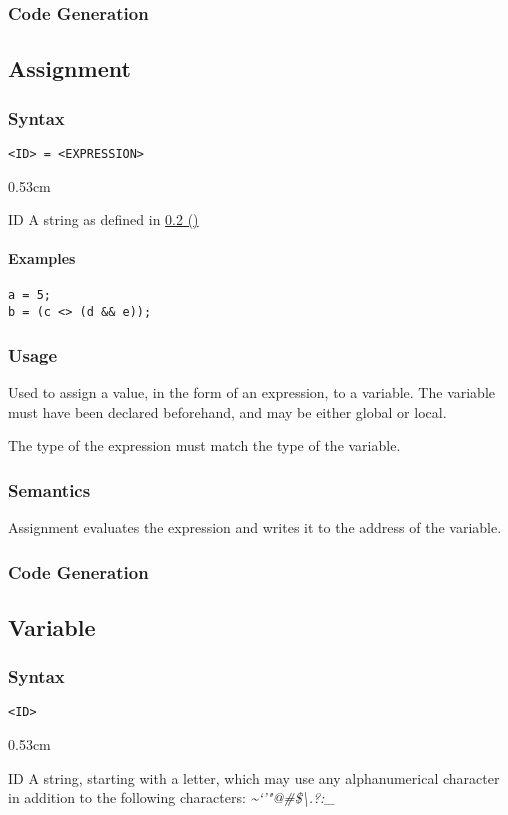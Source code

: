 \documentclass[twoside]{report}
\newcommand*{\fullref}[1]{\hyperref[{#1}]{\ref*{#1} (\nameref*{#1})}}
\newenvironment{mycompactdesc}{\begin{adjustwidth}{0.53cm}{}\begin{compactdesc}}{\end{compactdesc}\end{adjustwidth}}
\begin{document}
\subsubsection*{Code Generation}


\subsection{Assignment}
\label{def:assignment}
\subsubsection*{Syntax}
\texttt{<ID> = <EXPRESSION>}
\begin{mycompactdesc}
	\item[ID] A string as defined in \fullref{def:variable}
\end{mycompactdesc}
\paragraph{Examples}
\begin{verbatim}
a = 5;
b = (c <> (d && e));
\end{verbatim}
\subsubsection*{Usage}
Used to assign a value, in the form of an expression, to a variable. The variable must have been declared beforehand, and may be either global or local.

The type of the expression must match the type of the variable.
\subsubsection*{Semantics}
Assignment evaluates the expression and writes it to the address of the variable.
\subsubsection*{Code Generation}


\subsection{Variable}
\label{def:variable}
\subsubsection*{Syntax}
\texttt{<ID>}
\begin{mycompactdesc}
	\item[ID] A string, starting with a letter, which may use any alphanumerical character in addition to the following characters: \emph{\~{}`'"@\#\$\textbackslash.?:\_{}}
\end{mycompactdesc}
\end{document}
